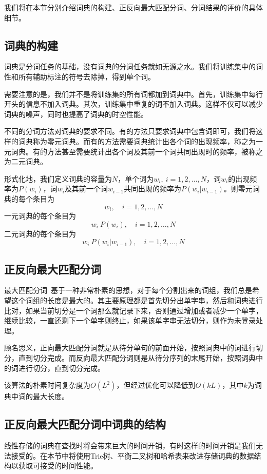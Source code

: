 \documentclass[11pt,a4paper]{article}
\begin{document}
	我们将在本节分别介绍词典的构建、正反向最大匹配分词、分词结果的评价的具体细节。
	
	\subsection{词典的构建}
	词典是分词任务的基础，没有词典的分词任务就如无源之水。我们将训练集中的词性和所有辅助标注的符号去除掉，得到单个词。
	
	需要注意的是，我们并不是将训练集的所有词都加到词典中。首先，训练集中每行开头的信息不加入词典。其次，训练集中重复的词不加入词典。这样不仅可以减少词典的噪声，同时也提高了词典的时空性能。
	
	不同的分词方法对词典的要求不同。有的方法只要求词典中包含词即可，我们将这样的词典称为零元词典。而有的方法需要词典统计出各个词的出现频率，称之为一元词典。有的方法甚至需要统计出各个词及其前一个词共同出现时的频率，被称之为二元词典。
	
	形式化地，我们定义词典的容量为$N$，单个词为$w_i,\ i=1, 2, \dots, N$，词$w_i$的出现频率为$P(w_i)$，词$w_i$及其前一个词$w_{i-1}$共同出现的频率为$P(w_i|w_{i-1})$。则零元词典的每个条目为
	\begin{equation}
		w_i,\quad i=1, 2, \dots, N
	\end{equation}
	一元词典的每个条目为
	\begin{equation}
		w_i\ P(w_i),\quad i=1, 2, \dots, N
	\end{equation}
	二元词典的每个条目为
	\begin{equation}
		w_i\ P(w_i|w_{i-1}),\quad i=1, 2, \dots, N
	\end{equation}
	
	\subsection{正反向最大匹配分词}
	最大匹配分词~\citep{edmonds1965maximum}基于一种非常朴素的思想，对于每个分割出来的词组，我们总是希望这个词组的长度是最大的。其主要原理都是首先切分出单字串，然后和词典进行比对，如果当前切分是一个词那么就记录下来，否则通过增加或者减少一个单字，继续比较，一直还剩下一个单字则终止，如果该单字串无法切分，则作为未登录处理。
	
	顾名思义，正向最大匹配分词就是从待分单句的前面开始，按照词典中的词进行切分，直到切分完成。而反向最大匹配分词则是从待分序列的末尾开始，按照词典中的词进行切分，直到切分完成。
	
	该算法的朴素时间复杂度为$O(L^2)$，但经过优化可以降低到$O(kL)$，其中$k$为词典中词的最大长度。
	
	\subsection{正反向最大匹配分词中词典的结构}
	线性存储的词典在查找时将会带来巨大的时间开销，有时这样的时间开销是我们无法接受的。在本节中将使用Trie树、平衡二叉树和哈希表来改进存储词典的数据结构以获取可接受的时间性能。
	
\end{document}
